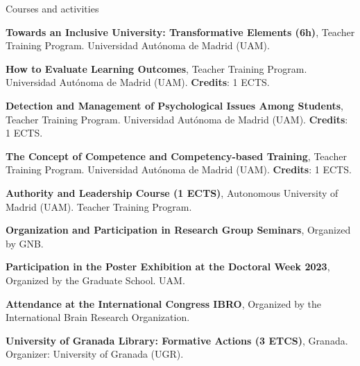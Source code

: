 \begin{rubric}{Courses and activities}

 \entry*[May 9-11, 2022] \textbf{Towards an Inclusive University: Transformative Elements (6h)}, Teacher Training Program. Universidad Autónoma de Madrid (UAM).


 \entry*[February 15-17, 2023] \textbf{How to Evaluate Learning Outcomes}, Teacher Training Program. Universidad Autónoma de Madrid (UAM). \textbf{Credits}: 1 ECTS.

 \entry*[April 20-27, 2023] \textbf{Detection and Management of Psychological Issues Among Students}, Teacher Training Program. Universidad Autónoma de Madrid (UAM). \textbf{Credits}: 1 ECTS.

 \entry*[October 17-24, 2023] \textbf{The Concept of Competence and Competency-based Training}, Teacher Training Program. Universidad Autónoma de Madrid (UAM). \textbf{Credits}: 1 ECTS.

\entry*[February 19-20, 2024] \textbf{Authority and Leadership Course (1 ECTS)}, Autonomous University of Madrid (UAM). Teacher Training Program.

  \textbf{Organization and Participation in Research Group Seminars}, Organized by GNB.

\entry*[June 2023] \textbf{Participation in the Poster Exhibition at the Doctoral Week 2023}, Organized by the Graduate School. UAM.

\entry*[September 2023] \textbf{Attendance at the International Congress IBRO}, Organized by the International Brain Research Organization.

 \textbf{University of Granada Library: Formative Actions (3 ETCS)}, Granada. Organizer: University of Granada (UGR).

\end{rubric}